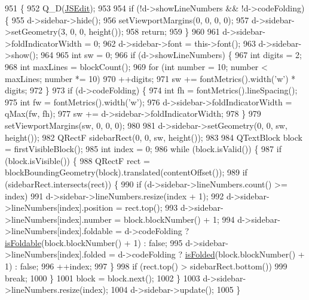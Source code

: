 \begin{DoxyCode}
951 \{
952     Q\_D(\hyperlink{class_j_s_edit}{JSEdit});
953 
954     \textcolor{keywordflow}{if} (!d->showLineNumbers && !d->codeFolding) \{
955         d->sidebar->hide();
956         setViewportMargins(0, 0, 0, 0);
957         d->sidebar->setGeometry(3, 0, 0, height());
958         \textcolor{keywordflow}{return};
959     \}
960 
961     d->sidebar->foldIndicatorWidth = 0;
962     d->sidebar->font = this->font();
963     d->sidebar->show();
964 
965     \textcolor{keywordtype}{int} sw = 0;
966     \textcolor{keywordflow}{if} (d->showLineNumbers) \{
967         \textcolor{keywordtype}{int} digits = 2;
968         \textcolor{keywordtype}{int} maxLines = blockCount();
969         \textcolor{keywordflow}{for} (\textcolor{keywordtype}{int} number = 10; number < maxLines; number *= 10)
970             ++digits;
971         sw += fontMetrics().width(\textcolor{charliteral}{'w'}) * digits;
972     \}
973     \textcolor{keywordflow}{if} (d->codeFolding) \{
974         \textcolor{keywordtype}{int} fh = fontMetrics().lineSpacing();
975         \textcolor{keywordtype}{int} fw = fontMetrics().width(\textcolor{charliteral}{'w'});
976         d->sidebar->foldIndicatorWidth = qMax(fw, fh);
977         sw += d->sidebar->foldIndicatorWidth;
978     \}
979     setViewportMargins(sw, 0, 0, 0);
980 
981     d->sidebar->setGeometry(0, 0, sw, height());
982     QRectF sidebarRect(0, 0, sw, height());
983 
984     QTextBlock block = firstVisibleBlock();
985     \textcolor{keywordtype}{int} index = 0;
986     \textcolor{keywordflow}{while} (block.isValid()) \{
987         \textcolor{keywordflow}{if} (block.isVisible()) \{
988             QRectF rect = blockBoundingGeometry(block).translated(contentOffset());
989             \textcolor{keywordflow}{if} (sidebarRect.intersects(rect)) \{
990                 \textcolor{keywordflow}{if} (d->sidebar->lineNumbers.count() >= index)
991                     d->sidebar->lineNumbers.resize(index + 1);
992                 d->sidebar->lineNumbers[index].position = rect.top();
993                 d->sidebar->lineNumbers[index].number = block.blockNumber() + 1;
994                 d->sidebar->lineNumbers[index].foldable = d->codeFolding ? 
      \hyperlink{class_j_s_edit_aa9489a933ccc52750bbcac24d58d284c}{isFoldable}(block.blockNumber() + 1) : \textcolor{keyword}{false};
995                 d->sidebar->lineNumbers[index].folded = d->codeFolding ? 
      \hyperlink{class_j_s_edit_af06c6789b9046e6b42ec34e94820291b}{isFolded}(block.blockNumber() + 1) : \textcolor{keyword}{false};
996                 ++index;
997             \}
998             \textcolor{keywordflow}{if} (rect.top() > sidebarRect.bottom())
999                 \textcolor{keywordflow}{break};
1000         \}
1001         block = block.next();
1002     \}
1003     d->sidebar->lineNumbers.resize(index);
1004     d->sidebar->update();
1005 \}
\end{DoxyCode}
\mbox{\label{class_j_s_edit_a66017f13ed0ae775050bfe3e89afd407}} 
